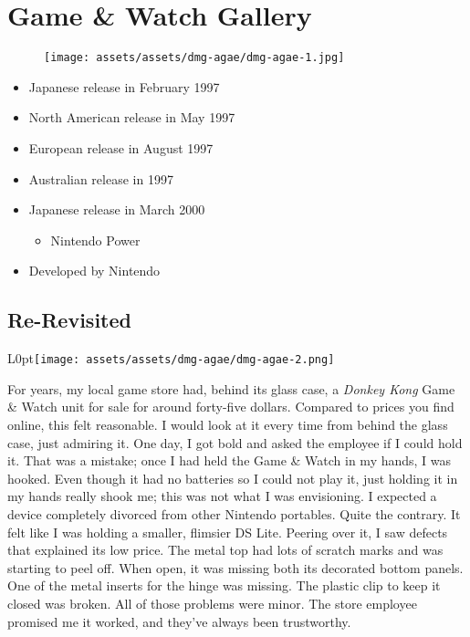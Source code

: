 \documentclass{book}
\begin{document}
\chapter*{Game \& Watch Gallery}
\vspace{\baselineskip}\begin{figure}[H]{\texttt{[image: assets/assets/dmg-agae/dmg-agae-1.jpg]}}\end{figure}\vspace{\baselineskip}
\begin{itemize}[left=0pt, nosep]
\item Japanese release in February 1997
\item North American release in May 1997
\item European release in August 1997
\item Australian release in 1997
\item Japanese release in March 2000
\begin{itemize}
\item Nintendo Power
\end{itemize}
\item Developed by Nintendo

\end{itemize}
\newpage\FloatBarrier\section*{Re-Revisited}
\begin{wrapfigure}{L}{0pt}{\texttt{[image: assets/assets/dmg-agae/dmg-agae-2.png]}}\end{wrapfigure}\noindent
For years, my local game store had, behind its glass case, a \emph{Donkey Kong} Game \& Watch unit for sale for around forty-five dollars. Compared to prices you find online, this felt reasonable. I would look at it every time from behind the glass case, just admiring it. One day, I got bold and asked the employee if I could hold it. That was a mistake; once I had held the Game \& Watch in my hands, I was hooked. Even though it had no batteries so I could not play it, just holding it in my hands really shook me; this was not what I was envisioning. I expected a device completely divorced from other Nintendo portables. Quite the contrary. It felt like I was holding a smaller, flimsier DS Lite. Peering over it, I saw defects that explained its low price. The metal top had lots of scratch marks and was starting to peel off. When open, it was missing both its decorated bottom panels. One of the metal inserts for the hinge was missing. The plastic clip to keep it closed was broken. All of those problems were minor. The store employee promised me it worked, and they’ve always been trustworthy.\par
\end{document}
